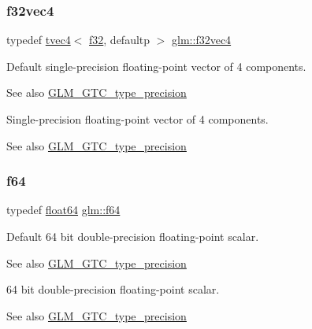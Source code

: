\subsubsection{\texorpdfstring{f32vec4}{f32vec4}}
{\footnotesize\ttfamily typedef \hyperlink{structglm_1_1tvec4}{tvec4}$<$ \hyperlink{group__gtc__type__precision_ga0ec999b57f5330d9021256e96038df04}{f32}, defaultp $>$ \hyperlink{group__gtc__type__precision_ga6848e3b5cb5c1f4c117717b309e726eb}{glm\+::f32vec4}}

Default single-\/precision floating-\/point vector of 4 components. \begin{DoxySeeAlso}{See also}
\hyperlink{group__gtc__type__precision}{G\+L\+M\+\_\+\+G\+T\+C\+\_\+type\+\_\+precision}
\end{DoxySeeAlso}
Single-\/precision floating-\/point vector of 4 components. \begin{DoxySeeAlso}{See also}
\hyperlink{group__gtc__type__precision}{G\+L\+M\+\_\+\+G\+T\+C\+\_\+type\+\_\+precision} 
\end{DoxySeeAlso}
\mbox{\label{group__gtc__type__precision_ga2bba392e555124b36cde6abba349bab3}} 
\subsubsection{\texorpdfstring{f64}{f64}}
{\footnotesize\ttfamily typedef \hyperlink{group__gtc__type__precision_gab721f828b41f46b20cf4883b50733d3b}{float64} \hyperlink{group__gtc__type__precision_ga2bba392e555124b36cde6abba349bab3}{glm\+::f64}}

Default 64 bit double-\/precision floating-\/point scalar. \begin{DoxySeeAlso}{See also}
\hyperlink{group__gtc__type__precision}{G\+L\+M\+\_\+\+G\+T\+C\+\_\+type\+\_\+precision}
\end{DoxySeeAlso}
64 bit double-\/precision floating-\/point scalar. \begin{DoxySeeAlso}{See also}
\hyperlink{group__gtc__type__precision}{G\+L\+M\+\_\+\+G\+T\+C\+\_\+type\+\_\+precision} 
\end{DoxySeeAlso}
\mbox{\label{group__gtc__type__precision_gaf66aa8b74ef627da80162c17a74a04fe}} 
